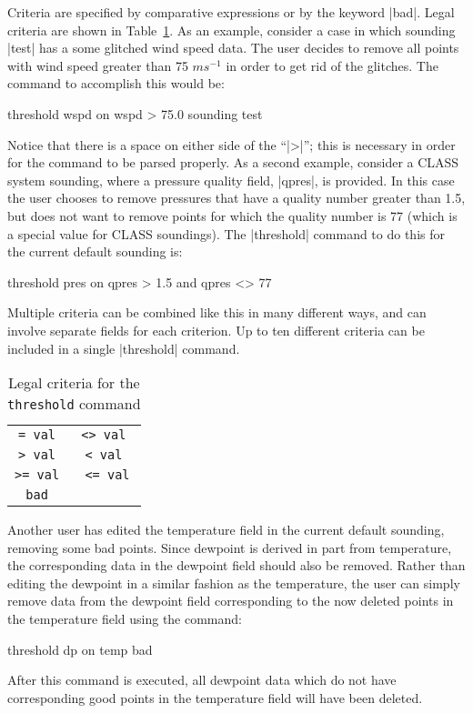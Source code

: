 Criteria are specified by comparative expressions or by the keyword |bad|.
Legal criteria are shown in Table~\ref{tbl-crit}.  As an example, consider
a case in which sounding |test| has a some glitched wind speed data.  The
user decides to remove all points with wind speed greater than 75 $ms^{-1}$
in order to get rid of the glitches.  The command to accomplish this would
be:
\begin{example}
	threshold wspd on wspd > 75.0 sounding test
\end{example}
Notice that there is a space on either side of the ``|>|''; this is
necessary in order for the command to be parsed properly.  As a second
example, consider a CLASS system sounding, where a pressure quality field,
|qpres|, is provided.  In this case the user chooses to remove pressures
that have a quality number greater than 1.5, but does not want to remove
points for which the quality number is 77 (which is a special value for
CLASS soundings).  The |threshold| command to do this for the current
default sounding is:
\begin{example}
	threshold pres on qpres > 1.5 and qpres <> 77
\end{example}
Multiple criteria can be combined like this in many different ways, and can
involve separate fields for each criterion.  Up to ten different criteria can
be included in a single |threshold| command.

\begin{table}[tp]
	\begin{center}
	\begin{tabular}{|c|c|}
		\hline
		\tt = \pf val	& \tt <> \pf val \\
		\tt > \pf val	& \tt < \pf val \\
		\tt >= \pf val	& \tt <= \pf val\\
		\tt bad 	& \\ \hline
	\end{tabular}
	\end{center}
	\caption{Legal criteria for the {\tt threshold} command}
	\label{tbl-crit}
\end{table}

Another user has edited the temperature field in the current default sounding,
removing some bad points.  Since dewpoint is derived in part from temperature,
the corresponding data in the dewpoint field should also be removed.  Rather
than editing the dewpoint in a similar fashion as the temperature, the user
can simply remove data from the dewpoint field corresponding to the now deleted
points in the temperature field using the command:
\begin{example}
	threshold dp on temp bad
\end{example}
After this command is executed, all dewpoint data which do not have 
corresponding good points in the temperature field will have been deleted.


